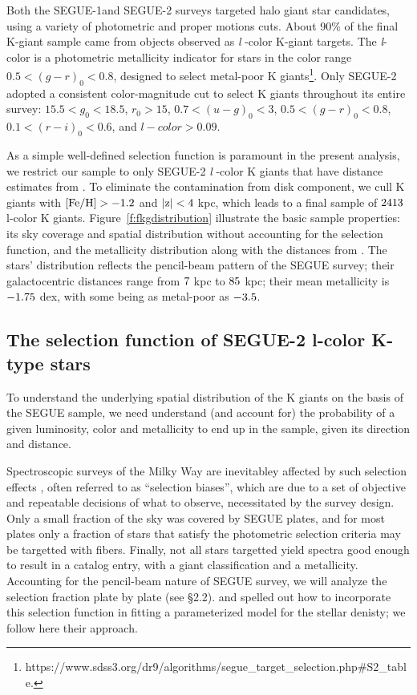\documentclass[12pt,preprint]{aastex}
\newcommand{\feh}{{\rm [Fe/H]}}
\begin{document}
Both the SEGUE-1and SEGUE-2 surveys targeted halo giant star candidates, using a variety of photometric and proper motions cuts.  About 90\% of the final K-giant sample came from objects observed as \textit{l} -color K-giant targets. 
The \textit{l}-color is a photometric metallicity indicator for stars in the color range $0.5 < (g-r)_0 < 0.8$, designed to select metal-poor K giants\footnote{https://www.sdss3.org/dr9/algorithms/segue\_target\_selection.php\#S2\_table.}.
Only SEGUE-2 adopted a consistent color-magnitude cut to select K giants throughout its entire survey: $15.5<g_0<18.5$, $r_0>15$, $0.7<(u-g)_0<3$, $0.5<(g-r)_0<0.8$, $0.1<(r-i)_0<0.6$, and $l-color>0.09$.

As a simple well-defined selection function is paramount in the present analysis, we restrict our sample to only SEGUE-2 
\textit{l} -color K giants that have distance estimates from \citet{Xue2014}.  To eliminate the contamination from disk component, we cull K giants with $\rm \feh>-1.2$ and $\rm |z|<4~$kpc, which leads to a final sample of $\rm 2413$ l-color K giants. Figure~\ref{f:fkgdistribution} illustrate the basic sample properties:  its sky coverage and spatial distribution without accounting for the selection function, and the metallicity distribution along with the distances from \citet{Xue2014}.  The stars' distribution reflects the pencil-beam pattern of the SEGUE survey; their galactocentric distances range  from $\rm 7~$kpc to $\rm 85~$kpc; their mean metallicity is $\rm -1.75~$dex, with some being as metal-poor as $\rm -3.5$.

 

\subsection{The selection function of SEGUE-2 l-color K-type stars}

To understand the underlying spatial distribution of the K giants on the basis of the SEGUE sample, we need understand (and account for) the probability of a given luminosity, color and metallicity to end up in the sample, given its direction and distance. 

Spectroscopic surveys of the Milky Way are inevitabley  affected by such selection effects \citet{Rix2013}, often referred to as ``selection biases'', which are due to a set of objective and repeatable decisions of what to observe, necessitated by the survey design. Only a small fraction of the sky was covered by SEGUE plates, and for most plates only a fraction of stars that satisfy the photometric selection criteria may be targetted with fibers. Finally, not all stars targetted yield spectra good enough to result in a catalog entry, with a giant classification and a metallicity. Accounting for the pencil-beam nature of SEGUE survey, we will analyze the selection fraction plate by plate (see \S2.2). 
\citet{Bovy2012} and \citet{Rix2013} spelled out how to incorporate this selection function in fitting a parameterized model for the stellar denisty; we follow here their approach.  
\end{document}
